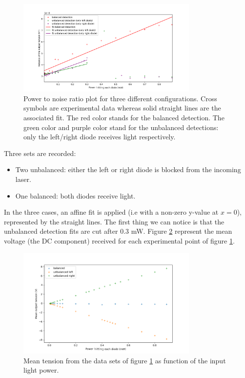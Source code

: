 \documentclass[11pt]{report}
\begin{document}
\begin{figure}[h!]
\centering
\includegraphics[width=0.8\textwidth]{power2noise}
\caption{Power to noise ratio plot for three different configurations. Cross symbols are experimental data whereas solid straight lines are the associated fit. The red color stands for the balanced detection. The green color and purple color stand for the unbalanced detections: only the left/right diode receives light respectively.}
\label{fig:power2noise}
\end{figure}

Three sets are recorded:
\begin{itemize}
	\item Two unbalanced: either the left or right diode is blocked from the incoming laser.
	\item One balanced: both diodes receive light.
\end{itemize}
In the three cases, an affine fit is applied (i.e with a non-zero y-value at $x=0$), represented by the straight lines. The first thing we can notice is that the unbalanced detection fits are cut after 0.3 mW. Figure \ref{fig:power2tension} represent the mean voltage (the DC component) received for each experimental point of figure \ref{fig:power2noise}.

\begin{figure}[h!]
\centering
\includegraphics[width=0.8\textwidth]{power2tension}
\caption{Mean tension from the data sets of figure \ref{fig:power2noise} as function of the input light power. }
\label{fig:power2tension}
\end{figure}
\end{document}
